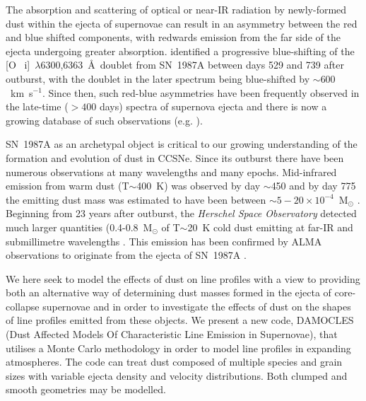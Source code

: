 \documentclass[useAMS,usenatbib,usegraphicx]{mnras}
\begin{document}
The absorption and scattering of optical or near-IR radiation by 
newly-formed dust within the ejecta of supernovae can result in an 
asymmetry between the red and blue shifted components, with redwards 
emission from the far side of the ejecta undergoing greater absorption. 
\citet{Lucy1989} identified a progressive blue-shifting of the [O~{\sc 
i}]~$\lambda$6300,6363~\AA\ doublet from SN~1987A between days 529 and 739 
after outburst, with the doublet in the later spectrum being blue-shifted 
by $\sim 600 $~km~s$^{-1}$. Since then, such red-blue asymmetries have 
been frequently observed in the late-time ($ > 400$ days) spectra of 
supernova ejecta and there is now a growing database of such observations (e.g.
\citet{Lucy1989,Fabbri2011,Mauerhan2012,Milisavljevic2012}).

SN~1987A as an archetypal object is critical to our growing understanding 
of the formation and evolution of dust in CCSNe.  Since its outburst there 
have been numerous observations at many wavelengths and many epochs. 
Mid-infrared emission from warm dust (T$\sim$400~K) was observed by day 
$\sim$450 \citep{Roche1989, Bouchet1991, Wooden1993} and by day 775 the 
emitting dust mass was estimated to have been between
$\sim5-20\times10^{-4}$~M$_\odot$ \citep{Wooden1993, Ercolano2007, 
Wesson2015}. Beginning from 23 years after outburst, the {\em Herschel 
Space Observatory} detected much larger quantities 
(0.4-0.8~M$_\odot$ of T$\sim$20~K cold dust emitting at far-IR 
and submillimetre wavelengths \citep{Matsuura2011, Matsuura2015}. This 
emission has been confirmed by ALMA observations to originate from the 
ejecta of SN~1987A \citep{Indebetouw2014}.


We here seek to model  the effects of dust on line profiles with a 
view to providing both an alternative way of determining dust 
masses formed in the ejecta of core-collapse supernovae and in order to investigate 
the  effects of dust on the shapes of line profiles emitted from 
these objects.  We present a new code, DAMOCLES (Dust Affected Models Of 
Characteristic Line Emission in Supernovae), that utilises a Monte Carlo 
methodology in order to  model line profiles in expanding 
atmospheres.  The code can treat dust composed of multiple species 
and grain sizes with variable ejecta density and velocity distributions.  Both 
clumped and smooth geometries may be modelled.
\end{document}
